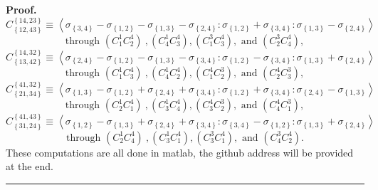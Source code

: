 \documentclass{unswthesis}
\newenvironment{proof}[1][Proof]{\noindent\textbf{#1.} }{\ \rule{0.5em}{0.5em}}
\begin{document}
\begin{proof}
\begin{equation*}
C_{\left\{ 12,43\right\} }^{\left\{ 14,23\right\} }\equiv \left\langle
\sigma _{\left\{ 3,4\right\} }-\sigma _{\left\{ 1,2\right\} }-\sigma
_{\left\{ 1,3\right\} }-\sigma _{\left\{ 2,4\right\} }:\sigma _{\left\{
1,2\right\} }+\sigma _{\left\{ 3,4\right\} }:\sigma _{\left\{ 1,3\right\}
}-\sigma _{\left\{ 2,4\right\} }\right\rangle 
\end{equation*}%
\begin{equation*}
\text{through }\left( C_{1}^{1}C_{2}^{4}\right) \ ,\left(
C_{4}^{1}C_{3}^{4}\right) ,\left( C_{1}^{3}C_{3}^{4}\right) ,\text{ and }%
\left( C_{2}^{3}C_{4}^{4}\right) , 
\end{equation*}%
\begin{equation*}
C_{\left\{ 13,42\right\} }^{\left\{ 14,32\right\} }\equiv \left\langle
\sigma _{\left\{ 2,4\right\} }-\sigma _{\left\{ 1,2\right\} }-\sigma
_{\left\{ 1,3\right\} }-\sigma _{\left\{ 3,4\right\} }:\sigma _{\left\{
1,2\right\} }-\sigma _{\left\{ 3,4\right\} }:\sigma _{\left\{ 1,3\right\}
}+\sigma _{\left\{ 2,4\right\} }\right\rangle 
\end{equation*}%
\begin{equation*}
\text{through }\left( C_{1}^{1}C_{3}^{4}\right) \ ,\left(
C_{4}^{1}C_{2}^{4}\right) ,\left( C_{1}^{4}C_{2}^{3}\right) ,\text{ and }%
\left( C_{2}^{4}C_{3}^{3}\right) , 
\end{equation*}%
\begin{equation*}
C_{\left\{ 21,34\right\} }^{\left\{ 41,32\right\} }\equiv \left\langle
\sigma _{\left\{ 1,3\right\} }-\sigma _{\left\{ 1,2\right\} }+\sigma
_{\left\{ 2,4\right\} }+\sigma _{\left\{ 3,4\right\} }:\sigma _{\left\{
1,2\right\} }+\sigma _{\left\{ 3,4\right\} }:\sigma _{\left\{ 2,4\right\}
}-\sigma _{\left\{ 1,3\right\} }\right\rangle 
\end{equation*}%
\begin{equation*}
\text{through }\left( C_{2}^{1}C_{1}^{4}\right) \ ,\left(
C_{3}^{1}C_{4}^{4}\right) ,\left( C_{3}^{4}C_{2}^{3}\right) ,\text{ and }%
\left( C_{4}^{4}C_{1}^{3}\right) , 
\end{equation*}%
\begin{equation*}
C_{\left\{ 31,24\right\} }^{\left\{ 41,43\right\} }\equiv \left\langle
\sigma _{\left\{ 1,2\right\} }-\sigma _{\left\{ 1,3\right\} }+\sigma
_{\left\{ 2,4\right\} }+\sigma _{\left\{ 3,4\right\} }:\sigma _{\left\{
3,4\right\} }-\sigma _{\left\{ 1,2\right\} }:\sigma _{\left\{ 1,3\right\}
}+\sigma _{\left\{ 2,4\right\} }\right\rangle 
\end{equation*}%
\begin{equation*}
\text{through }\left( C_{2}^{1}C_{4}^{4}\right) \ ,\left(
C_{3}^{1}C_{1}^{4}\right) ,\left( C_{3}^{3}C_{1}^{4}\right) ,\text{ and }%
\left( C_{4}^{3}C_{2}^{4}\right) . 
\end{equation*}%
These computations are all done in matlab, the github address will be
provided at the end.
\end{proof}
\end{document}
